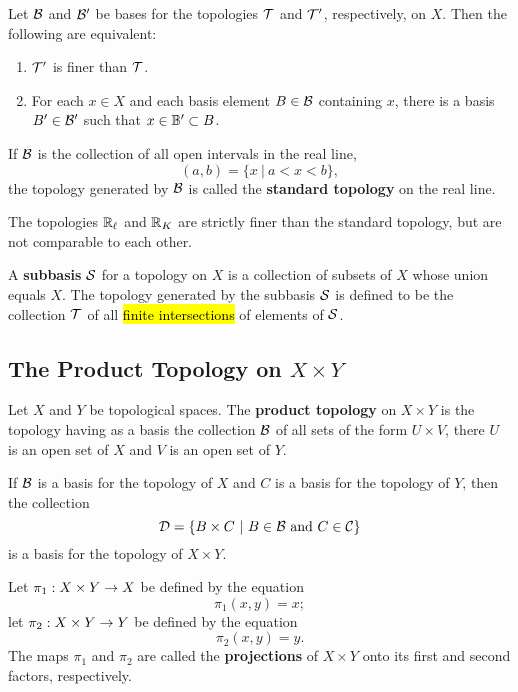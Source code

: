 \vs

 Let $\mathcal{B}$ and $\mathcal{B}^\prime$ be bases for the topologies $\mathcal{T}$ and $\mathcal{T}^\prime$, respectively, on $X$. Then the following are equivalent:
\begin{enumerate}
    \item $\mathcal{T}^\prime$ is finer than $\mathcal{T}$.
    \item For each $x\in X$ and each basis element $B\in \mathcal{B}$ containing $x$, there is a basis $B^\prime \in \mathcal{B}^\prime$ such that $x\in \mathbb{B}^\prime\subset B$.
\end{enumerate}

\dfn If $\mathcal{B}$ is the collection of all open intervals in the real line,
\[(a,b) = \{x\ |\ a < x < b\},\]
the topology generated by $\mathcal{B}$ is called the \textbf{standard topology} on the real line.

\vs

 The topologies $\mathbb{R}_\ell$ and $\mathbb{R}_K$ are strictly finer than the standard topology, but are not comparable to each other.

\vs

\dfn A \textbf{subbasis} $\mathcal{S}$ for a topology on $X$ is a collection of subsets of $X$ whose union equals $X$. The topology generated by the subbasis $\mathcal{S}$ is defined to be the collection $\mathcal{T}$ of all \hl{finite intersections} of elements of $\mathcal{S}$.

\vs

\subsection{The Product Topology on $X\times Y$}\nl


\dfn Let $X$ and $Y$ be topological spaces. The \textbf{product topology} on $X\times Y$ is the topology having as a basis the collection $\mathcal{B}$ of all sets of the form $U\times V$, there $U$ is an open set of $X$ and $V$ is an open set of $Y$.

\vs

 If $\mathcal{B}$ is a basis for the topology of $X$ and $C$ is a basis for the topology of $Y$, then the collection
\[\mathcal{D} = \{B\times C\ |\ B\in \mathcal{B}\text{ and }C\in \mathcal{C}\}\]
is a basis for the topology of $X\times Y$.

\vs

\dfn Let $\pi_1:X\times Y\rightarrow X$ be defined by the equation
\[\pi_1(x,y) = x;\]
let $\pi_2:X\times Y\rightarrow Y$ be defined by the equation
\[\pi_2(x,y) = y.\]
The maps $\pi_1$ and $\pi_2$ are called the \textbf{projections} of $X\times Y$ onto its first and second factors, respectively.

